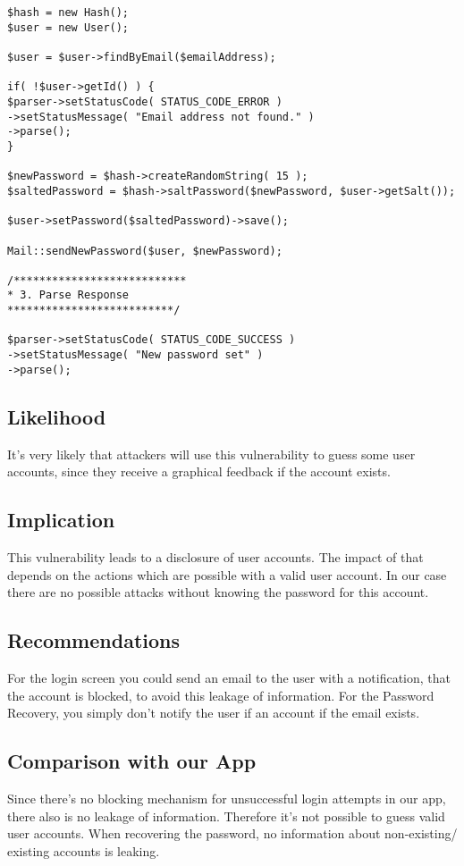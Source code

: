 \begin{lstlisting}[caption= Validating Email before generating new Passowrd  line 54-59 ,label=listing:forgotPassword]
$hash = new Hash();
$user = new User();

$user = $user->findByEmail($emailAddress);

if( !$user->getId() ) {
$parser->setStatusCode( STATUS_CODE_ERROR )
->setStatusMessage( "Email address not found." )
->parse();
}

$newPassword = $hash->createRandomString( 15 );
$saltedPassword = $hash->saltPassword($newPassword, $user->getSalt());

$user->setPassword($saltedPassword)->save();

Mail::sendNewPassword($user, $newPassword);

/***************************
* 3. Parse Response
**************************/

$parser->setStatusCode( STATUS_CODE_SUCCESS )
->setStatusMessage( "New password set" )
->parse();
\end{lstlisting}



\subsection{Likelihood}
It's very likely that attackers will use this vulnerability to guess some user accounts, since they receive a graphical feedback if the account exists.


\subsection{Implication} 
This vulnerability leads to a disclosure of user accounts. The impact of that depends on the actions which are possible with a valid user account. In our case there are no possible attacks without knowing the password for this account.


\subsection{Recommendations}
For the login screen  you could send an email to the user with a notification, that the account is blocked, to avoid this leakage of information. For the Password Recovery, you simply don't notify the user if an account if the email exists. 

\subsection{Comparison with our App}
Since there's no blocking mechanism for unsuccessful login attempts in our app, there also is no leakage of information. Therefore it's not possible to guess valid user accounts. When recovering the password, no information about non-existing/ existing accounts is leaking.

